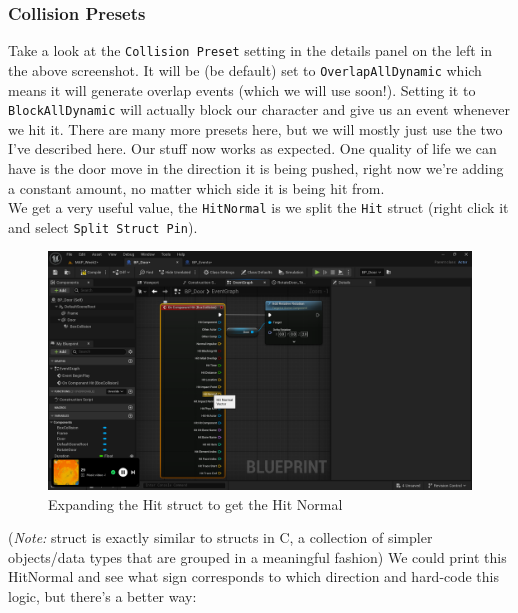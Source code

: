 \documentclass[]{article}
\begin{document}
	\subsubsection{Collision Presets}
	Take a look at the \verb|Collision Preset| setting in the details panel on the left in the above screenshot. It will be (be default) set to \verb*|OverlapAllDynamic| which means it will generate overlap events (which we will use soon!). Setting it to \verb*|BlockAllDynamic| will actually block our character and give us an event whenever we hit it. There are many more presets here, but we will mostly just use the two I've described here.
	\newpage
	Our stuff now works as expected. One quality of life we can have is the door move in the direction it is being pushed, right now we're adding a constant amount, no matter which side it is being hit from. \\[10pt] We get a very useful value, the \verb*|HitNormal| is we split the \verb*|Hit| struct (right click it and select \verb|Split Struct Pin|).
	
	\begin{figure}[h]
		\centering
		\includegraphics[width=1\linewidth]{week2part2/screenshot010}
		\caption{Expanding the Hit struct to get the Hit Normal}
		\label{fig:screenshot010}
	\end{figure}
	
	(\textit{Note:} struct is exactly similar to structs in C, a collection of simpler objects/data types that are grouped in a meaningful fashion)
		\newpage
	We could print this HitNormal and see what sign corresponds to which direction and hard-code this logic, but there's a better way:
\end{document}
